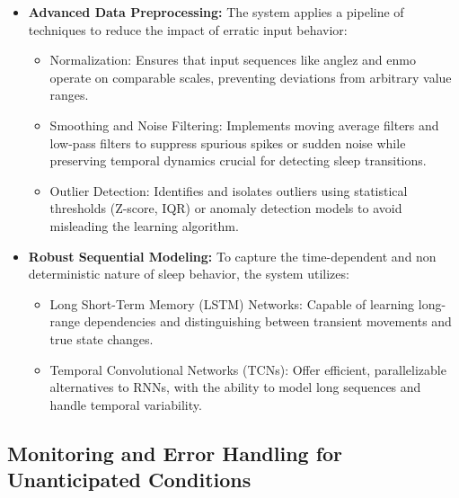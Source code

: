 \documentclass[conference]{IEEEtran}
\begin{document}
\begin{itemize}

\item \textbf{Advanced Data Preprocessing:}
The system applies a pipeline of techniques to reduce the impact of erratic input behavior:
\begin{itemize}
\item Normalization: Ensures that input sequences like anglez and enmo operate on comparable scales, preventing deviations from arbitrary value ranges.
\item Smoothing and Noise Filtering: Implements moving average filters and low-pass filters to suppress spurious spikes or sudden noise while preserving temporal dynamics crucial for detecting sleep transitions.
\item Outlier Detection: Identifies and isolates outliers using statistical thresholds (Z-score, IQR) or anomaly detection models to avoid misleading the learning algorithm.

\end{itemize}

\item \textbf{Robust Sequential Modeling:}  
To capture the time-dependent and non deterministic nature of sleep behavior, the system utilizes:
\begin{itemize}
    \item Long Short-Term Memory (LSTM) Networks: Capable of learning long-range dependencies and distinguishing between transient movements and true state changes.
    \item Temporal Convolutional Networks (TCNs): Offer efficient, parallelizable alternatives to RNNs, with the ability to model long sequences and handle temporal variability.
\end{itemize}

\end{itemize}

\subsection{Monitoring and Error Handling for Unanticipated Conditions}
\end{document}
